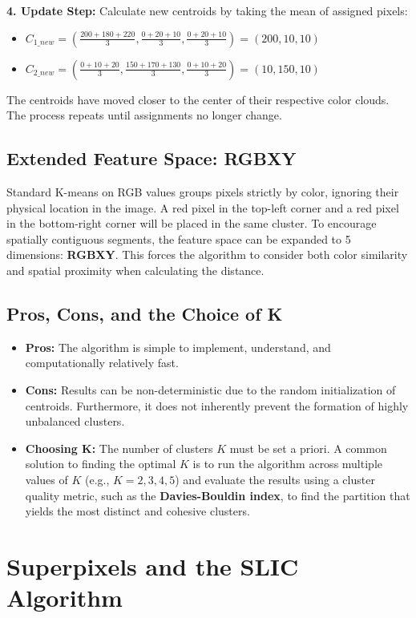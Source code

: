 \documentclass{report}
\begin{document}
\textbf{4. Update Step:}
Calculate new centroids by taking the mean of assigned pixels:
\begin{itemize}
    \item $C_{1\_new} = \left( \frac{200+180+220}{3}, \frac{0+20+10}{3}, \frac{0+20+10}{3} \right) = (200, 10, 10)$
    \item $C_{2\_new} = \left( \frac{0+10+20}{3}, \frac{150+170+130}{3}, \frac{0+10+20}{3} \right) = (10, 150, 10)$
\end{itemize}
The centroids have moved closer to the center of their respective color clouds. The process repeats until assignments no longer change.

\section{Extended Feature Space: RGBXY}
Standard K-means on RGB values groups pixels strictly by color, ignoring their physical location in the image. A red pixel in the top-left corner and a red pixel in the bottom-right corner will be placed in the same cluster. To encourage spatially contiguous segments, the feature space can be expanded to 5 dimensions: \textbf{RGBXY}. This forces the algorithm to consider both color similarity and spatial proximity when calculating the distance.

\section{Pros, Cons, and the Choice of K}
\begin{itemize}
    \item \textbf{Pros:} The algorithm is simple to implement, understand, and computationally relatively fast.
    \item \textbf{Cons:} Results can be non-deterministic due to the random initialization of centroids. Furthermore, it does not inherently prevent the formation of highly unbalanced clusters.
    \item \textbf{Choosing K:} The number of clusters $K$ must be set a priori. A common solution to finding the optimal $K$ is to run the algorithm across multiple values of $K$ (e.g., $K=2, 3, 4, 5$) and evaluate the results using a cluster quality metric, such as the \textbf{Davies-Bouldin index}, to find the partition that yields the most distinct and cohesive clusters.
\end{itemize}

\chapter{Superpixels and the SLIC Algorithm}
\end{document}
